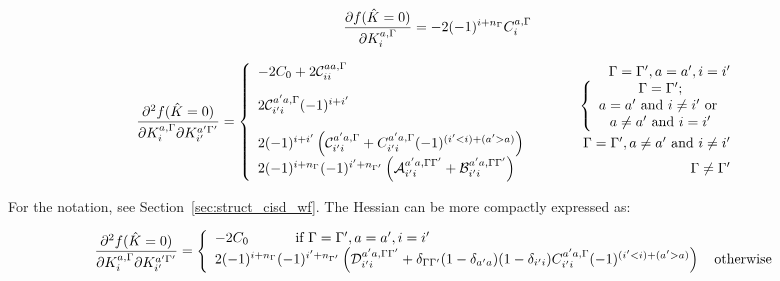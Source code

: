 \begin{equation}
  \frac{\partial f(\hat{K} = 0)}{\partial K_i^{a,\Gamma}} = -2(-1)^{i + n_{\Gamma}} C_i^{a,\Gamma}
\end{equation}

\begin{equation}
  \frac{\partial^2 f(\hat{K} = 0)}{\partial K_i^{a,\Gamma} \partial K_{i'}^{a'{\Gamma'}}} =
  \left\{
    \begin{array}{lcr}
      -2 C_0 + 2 \mathcal{C}_{ii}^{aa, \Gamma} & \quad\quad & \Gamma = {\Gamma'}, a=a', i=i'\\
      2 \mathcal{C}_{i'i}^{a'a, \Gamma} (-1)^{i + i'} & \quad\quad &
      \left\{\begin{array}{c}
              \Gamma = {\Gamma'};\\
              a=a'\text{ and }i\ne i'\text{ or }\\
              a \ne a'\text{ and }i = i'
            \end{array}
      \right.\\
      2  (-1)^{i + i'} \left(\mathcal{C}_{i'i}^{a'a, \Gamma} +
      C_{i'i}^{a'a, \Gamma} (-1)^{(i'<i) + (a'>a)}\right) & \quad\quad &
      \Gamma = {\Gamma'}, a \ne a'\text{ and }i\ne i'\\
      2 (-1)^{i+n_{\Gamma}}(-1)^{i'+n_{\Gamma'}}
      \left( \mathcal{A}_{i'i}^{a'a, \Gamma{\ensuremath{\Gamma'}}} + \mathcal{B}_{i'i}^{a'a, \Gamma{\ensuremath{\Gamma'}}} \right) & \quad\quad &
      \Gamma \ne {\ensuremath{\Gamma'}}
    \end{array}
  \right.
\end{equation}

For the notation, see Section~\ref{sec:struct_cisd_wf}.
The Hessian can be more compactly expressed as:

\begin{equation}
  \frac{\partial^2 f(\hat{K} = 0)}{\partial K_i^{a,\Gamma} \partial K_{i'}^{a'{\Gamma'}}} =
  \left\{
    \begin{array}{l}
      -2 C_0 \quad\quad\quad \text{ if }\Gamma = {\Gamma'}, a=a', i=i'\\
      2 (-1)^{i+n_{\Gamma}}(-1)^{i'+n_{\Gamma'}} \left( \mathcal{D}_{i'i}^{a'a, \Gamma{\ensuremath{\Gamma'}}} +
      \delta_{\Gamma{\ensuremath{\Gamma'}}}(1 - \delta_{a'a})(1 - \delta_{i'i})C_{i'i}^{a'a, \Gamma} (-1)^{(i'<i) + (a'>a)}\right)
             \quad \text{otherwise}
    \end{array}
  \right.
\end{equation}

